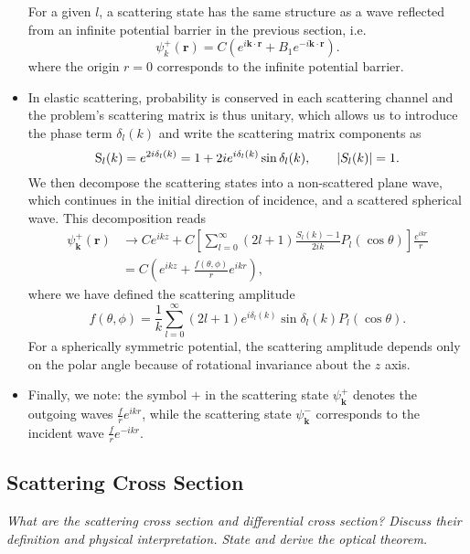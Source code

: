 \documentclass[11pt, a4paper]{article}
\renewcommand{\vec}[1]{\bm{#1}}  %
\renewcommand{\r}{\vec{r}}  %
\begin{document}
\begin{itemize}
    For a given $ l $, a scattering state has the same structure as a wave reflected from an infinite potential barrier in the previous section, i.e. 
    \begin{equation*}
        \psi_{k}^{+}(\r) = C \left( e^{i \vec{k} \cdot \r} + B_{1} e^{- i \vec{k} \cdot \r} \right).
    \end{equation*}
    where the origin $ r = 0 $ corresponds to the infinite potential barrier. 
    
    \item In elastic scattering, probability is conserved in each scattering channel and the problem's scattering matrix is thus unitary, which allows us to introduce the phase term $ \delta_{l}(k) $ and write the scattering matrix components as
    \begin{equation*}
        \mathrm{S}_{l}(k) = e^{2i \delta_{l}(k)} = 1 + 2i e^{i \delta_{l}(k)} \sin \delta_{l}(k), \qquad \abs{S_{l}(k)} = 1.
    \end{equation*}
    We then decompose the scattering states into a non-scattered plane wave, which continues in the initial direction of incidence, and a scattered spherical wave. This decomposition reads
    \begin{align*}
        \psi_{\vec{k}}^{+}(\r) &\to C e^{ikz} + C \left[ \sum_{l = 0}^{\infty} (2l + 1) \frac{S_{l}(k) - 1}{2ik} P_{l}(\cos \theta) \right]\frac{e^{ikr}}{r}\\
        & = C \left( e^{ikz} + \frac{f(\theta, \phi)}{r} e^{ikr} \right),
    \end{align*}
    where we have defined the scattering amplitude
    \begin{equation*}
        f(\theta, \phi) = \frac{1}{k} \sum_{l = 0}^{\infty} (2l + 1)e^{i\delta_{l}(k)} \sin \delta_{l}(k) P_{l}(\cos \theta).
    \end{equation*}
    For a spherically symmetric potential, the scattering amplitude depends only on the polar angle because of rotational invariance about the $ z $ axis. 

    \item Finally, we note: the symbol $ + $ in the scattering state $ \psi_{\vec{k}}^{+} $ denotes the outgoing waves $ \frac{f}{r}e^{ikr} $, while the scattering state $ \psi_{\vec{k}}^{-} $ corresponds to the incident wave $ \frac{f}{r}e^{-ikr} $.

\end{itemize}
	
\subsection{Scattering Cross Section}
\textit{What are the scattering cross section and differential cross section? Discuss their definition and physical interpretation. State and derive the optical theorem.}
\end{document}
